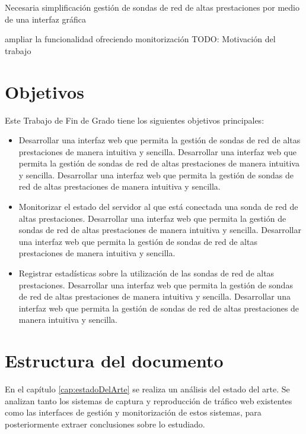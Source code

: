 Necesaria simplificación gestión de sondas de red de altas prestaciones por medio de una interfaz gráfica

ampliar la funcionalidad ofreciendo monitorización 
TODO: Motivación del trabajo


\section{Objetivos}

Este Trabajo de Fin de Grado tiene los siguientes objetivos principales:

\begin{itemize}
  \item Desarrollar una interfaz web que permita la gestión de sondas de red de altas prestaciones de manera intuitiva y sencilla.
  Desarrollar una interfaz web que permita la gestión de sondas de red de altas prestaciones de manera intuitiva y sencilla.
  Desarrollar una interfaz web que permita la gestión de sondas de red de altas prestaciones de manera intuitiva y sencilla.

  \item Monitorizar el estado del servidor al que está conectada una sonda de red de altas prestaciones.
Desarrollar una interfaz web que permita la gestión de sondas de red de altas prestaciones de manera intuitiva y sencilla.
Desarrollar una interfaz web que permita la gestión de sondas de red de altas prestaciones de manera intuitiva y sencilla.

  \item Registrar estadísticas sobre la utilización de las sondas de red de altas prestaciones.
Desarrollar una interfaz web que permita la gestión de sondas de red de altas prestaciones de manera intuitiva y sencilla.
Desarrollar una interfaz web que permita la gestión de sondas de red de altas prestaciones de manera intuitiva y sencilla.
\end{itemize}

\section{Estructura del documento}

En el capítulo \ref{cap:estadoDelArte} se realiza un análisis del estado del arte. Se analizan tanto los sistemas de captura y reproducción de tráfico web existentes como las interfaces de gestión y monitorización de estos sistemas, para posteriormente extraer conclusiones sobre lo estudiado.

